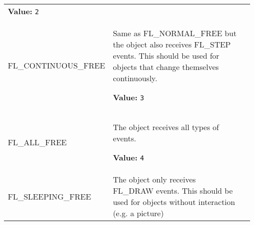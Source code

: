 \begin{longtable}{|p{\varnamewidth}|p{\vardescrwidth}|l}
\textbf{Value:} 
{\tt 2}&\\
\cline{1-2}
\raggedright F\-L\-\_\-C\-O\-N\-T\-I\-N\-U\-O\-U\-S\-\_\-F\-R\-E\-E\- & \raggedright Same as FL\_NORMAL\_FREE but the object also receives FL\_STEP 
          events. This should be used for objects that change themselves 
          continuously.

\textbf{Value:} 
{\tt 3}&\\
\cline{1-2}
\raggedright F\-L\-\_\-A\-L\-L\-\_\-F\-R\-E\-E\- & \raggedright The object receives all types of events.

\textbf{Value:} 
{\tt 4}&\\
\cline{1-2}
\raggedright F\-L\-\_\-S\-L\-E\-E\-P\-I\-N\-G\-\_\-F\-R\-E\-E\- & \raggedright The object only receives FL\_DRAW events. This should be used for
          objects without interaction (e.g. a picture)


\end{longtable}
